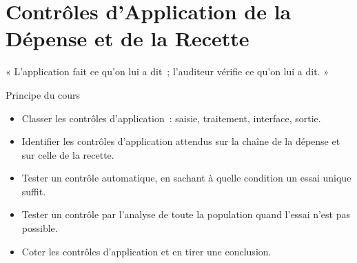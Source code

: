 
\chapter{Contrôles d'Application de la Dépense et de la Recette}
\label{chap:applications}

\epigraph{%
    « L'application fait ce qu'on lui a dit~; l'auditeur vérifie ce qu'on
    lui a dit. »%
}{Principe du cours}


\begin{boxobjectifs}
\begin{itemize}
    \item Classer les contrôles d'application~: saisie, traitement,
          interface, sortie.
    \item Identifier les contrôles d'application attendus sur la chaîne de
          la dépense et sur celle de la recette.
    \item Tester un contrôle automatique, en sachant à quelle condition un
          essai unique suffit.
    \item Tester un contrôle par l'analyse de toute la population quand
          l'essai n'est pas possible.
    \item Coter les contrôles d'application et en tirer une conclusion.
\end{itemize}
\end{boxobjectifs}

